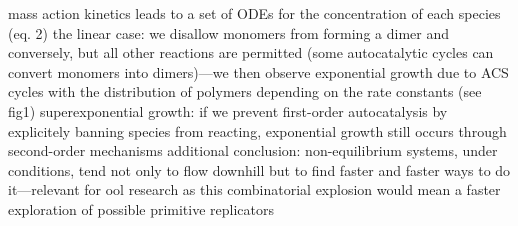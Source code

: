 \markdownRendererUlItem mass action kinetics leads to a set of ODEs for the concentration of each species (eq. 2)\markdownRendererUlItemEnd 
\markdownRendererUlItem the linear case: we disallow monomers from forming a dimer and conversely, but all other reactions are permitted (some autocatalytic cycles can convert monomers into dimers)—we then observe exponential growth due to ACS cycles with the distribution of polymers depending on the rate constants (see fig1)\markdownRendererUlItemEnd 
\markdownRendererUlItem superexponential growth: if we prevent first-order autocatalysis by explicitely banning species from reacting, exponential growth still occurs through second-order mechanisms\markdownRendererUlItemEnd 
\markdownRendererUlItem additional conclusion: non-equilibrium systems, under  conditions, tend not only to flow downhill but to find faster and faster ways to do it—relevant for ool research as this combinatorial explosion would mean a faster exploration of possible primitive replicators\markdownRendererUlItemEnd 
\markdownRendererUlEnd \markdownRendererDocumentEnd